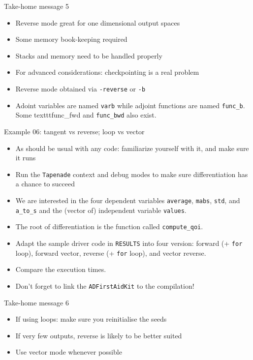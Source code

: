 \documentclass[12pt,xcolor={table}]{beamer}
\begin{document}
\begin{frame}{Take-home message 5}
  \begin{itemize}
    \item Reverse mode great for one dimensional output spaces
    \item Some memory book-keeping required
    \item Stacks and memory need to be handled properly
    \item For advanced considerations: checkpointing is a real problem
    \item Reverse mode obtained via \texttt{-reverse} or \texttt{-b}
    \item Adoint variables are named \texttt{varb} while adjoint functions are named \texttt{func\_b}. Some texttt{func\_fwd} and \texttt{func\_bwd} also exist.
  \end{itemize}
\end{frame}

\begin{frame}{Example 06: tangent vs reverse; loop vs vector}
  \begin{itemize}
    \item As should be usual with any code: familiarize yourself with it, and make sure it runs
    \item Run the \texttt{Tapenade} context and debug modes to make sure differentiation has a chance to succeed
    \item We are interested in the four dependent variables \texttt{average}, \texttt{mabs}, \texttt{std}, and \texttt{a\_to\_s} and the (vector of) independent variable \texttt{values}. 
    \item The root of differentiation is the function called \texttt{compute\_qoi}.
    \item Adapt the sample driver code in \texttt{RESULTS} into four version: forward (+ \texttt{for} loop), forward vector, reverse (+ \texttt{for} loop), and vector reverse.
    \item Compare the execution times.
    \item Don't forget to link the \texttt{ADFirstAidKit} to the compilation!
  \end{itemize}
\end{frame}

\begin{frame}{Take-home message 6}
  \begin{itemize}
    \item If using loops: make sure you reinitialise the seeds
    \item If very few outputs, reverse is likely to be better suited
    \item Use vector mode whenever possible
  \end{itemize}
\end{frame}
\end{document}
